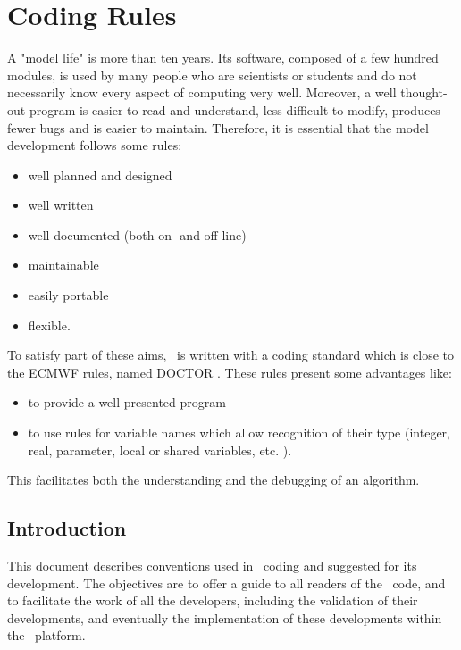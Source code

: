 
\chapter{Coding Rules}
\label{apdx:CODING}

\chaptertoc

\newpage

A "model life" is more than ten years.
Its software, composed of a few hundred modules, is used by many people who are scientists or students and
do not necessarily know every aspect of computing very well.
Moreover, a well thought-out program is easier to read and understand, less difficult to modify,
produces fewer bugs and is easier to maintain.
Therefore, it is essential that the model development follows some rules:

\begin{itemize}
\item well planned and designed
\item well written
\item well documented (both on- and off-line)
\item maintainable
\item easily portable
\item flexible.
\end{itemize}

To satisfy part of these aims, \NEMO\ is written with a coding standard which is close to the ECMWF rules,
named DOCTOR \citep{gibson_trpt86}.
These rules present some advantages like:

\begin{itemize}
\item to provide a well presented program
\item to use rules for variable names which allow recognition of their type 	(integer, real, parameter, local or shared variables, etc. ).
\end{itemize}

This facilitates both the understanding and the debugging of an algorithm.

\section{Introduction}

This document describes conventions used in \NEMO\ coding and suggested for its development.
The objectives are to offer a guide to all readers of the \NEMO\ code, and to facilitate the work of
all the developers, including the validation of their developments, and
eventually the implementation of these developments within the \NEMO\ platform.

